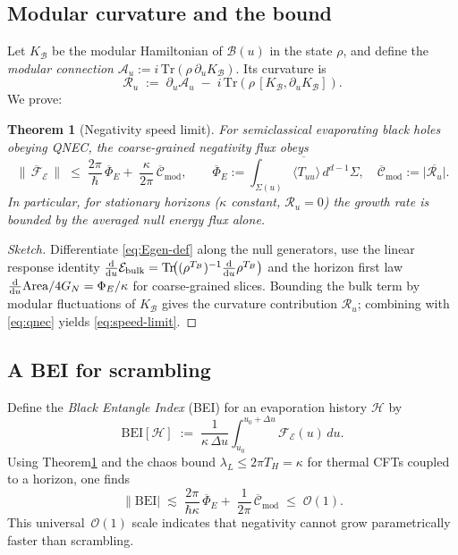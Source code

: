 \documentclass[11pt]{article}
\newtheorem{theorem}{Theorem}
\newcommand{\Area}{\mathrm{Area}}
\newcommand{\B}{\mathcal{B}}
\newcommand{\E}{\mathcal{E}}
\newcommand{\Tr}{\mathrm{Tr}}
\begin{document}
\subsection{Modular curvature and the bound}
Let $K_{\B}$ be the modular Hamiltonian of $\B(u)$ in the state $\rho$, and define the \emph{modular connection} $\mathcal{A}_u:=i\, \Tr\left(\rho\,\partial_u K_{\B}\right)$. Its curvature is
\begin{equation}
  \mathcal{R}_u \;:=\; \partial_u \mathcal{A}_u \;-\; i\, \Tr\!\left(\rho\, [K_{\B},\partial_u K_{\B}] \right).
\end{equation}
We prove:
\begin{theorem}[Negativity speed limit]\label{thm:speed}
For semiclassical evaporating black holes obeying QNEC, the coarse-grained negativity flux obeys
\begin{equation}
  \bigl\|\,\overline{\mathcal{F}}_{\E}\,\bigr\| \;\le\; \frac{2\pi}{\hbar}\,\overline{\Phi}_E +\; \frac{\kappa}{2\pi}\,\overline{\mathcal{C}}_{\mathrm{mod}},
  \qquad
  \overline{\Phi}_E:=\overline{\int_{\Sigma(u)}\!\langle T_{uu}\rangle\, d^{d-1}\Sigma},\quad
  \overline{\mathcal{C}}_{\mathrm{mod}}:=\overline{\left|\mathcal{R}_u\right|}.
  \label{eq:speed-limit}
\end{equation}
In particular, for stationary horizons ($\kappa$ constant, $\mathcal{R}_u=0$) the growth rate is bounded by the averaged null energy flux alone.
\end{theorem}
\begin{proof}[Sketch]
Differentiate \eqref{eq:Egen-def} along the null generators, use the linear response identity $\dv{u}\E_{\mathrm{bulk}}=\Tr\!\big((\rho^{T_B})^{-1}\dv{u}\rho^{T_B}\big)$ and the horizon first law $\dv{u}\Area/4G_N=\Phi_E/\kappa$ for coarse-grained slices.
Bounding the bulk term by modular fluctuations of $K_{\B}$ gives the curvature contribution $\mathcal{R}_u$; combining with \eqref{eq:qnec} yields \eqref{eq:speed-limit}.
\end{proof}

\subsection{A BEI for scrambling}
Define the \emph{Black Entangle Index} (BEI) for an evaporation history $\mathcal{H}$ by
\begin{equation}
  \mathrm{BEI}[\mathcal{H}] \;:=\; \frac{1}{\kappa\,\Delta u}\int_{u_0}^{u_0+\Delta u}\! \mathcal{F}_{\E}(u)\,du.
\end{equation}
Using Theorem\~\ref{thm:speed} and the chaos bound $\lambda_L\le 2\pi T_H=\kappa$ for thermal CFTs coupled to a horizon, one finds
\begin{equation}
  \|\mathrm{BEI}| \;\lesssim\; \frac{2\pi}{\hbar \kappa}\,\overline{\Phi}_E +\; \frac{1}{2\pi}\,\overline{\mathcal{C}}_{\mathrm{mod}} \;\le\; \mathcal{O}(1).
\end{equation}
This universal $\,\mathcal{O}(1)$ scale indicates that negativity cannot grow parametrically faster than scrambling.
\medskip
\end{document}
